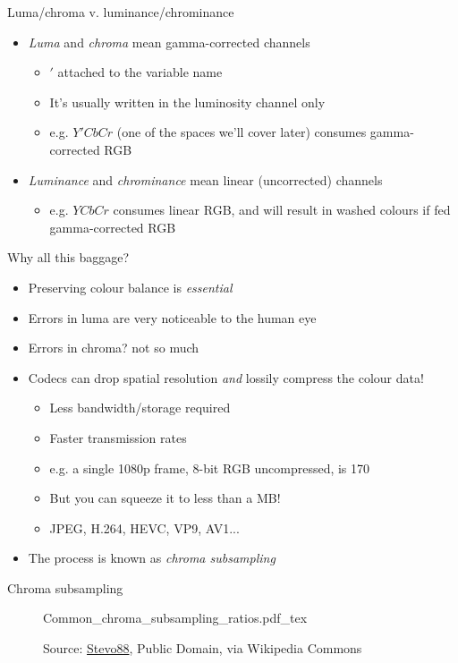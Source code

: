\documentclass[aspectratio=169,handout,usepdftitle=false]{fireshonks}
\begin{document}
\begin{frame}{Luma/chroma v. luminance/chrominance}
    \begin{itemize}
        \item \emph{Luma} and \emph{chroma} mean gamma-corrected channels
              \begin{itemize}
                  \item $'$ attached to the variable name
                  \item It's usually written in the luminosity channel only
                  \item e.g. $Y'CbCr$ (one of the spaces we'll cover later) consumes gamma-corrected RGB
              \end{itemize}
        \item \emph{Luminance} and \emph{chrominance} mean linear (uncorrected) channels
              \begin{itemize}
                  \item e.g. $YCbCr$ consumes linear RGB, and will result in washed colours if fed gamma-corrected RGB
              \end{itemize}
    \end{itemize}
\end{frame}
\begin{frame}{Why all this baggage?}
    \begin{itemize}
        \item Preserving colour balance is \emph{essential}
        \item Errors in luma are very noticeable to the human eye
        \item Errors in chroma? not so much
        \item Codecs can drop spatial resolution \emph{and} lossily compress the colour data!
              \begin{itemize}
                  \item Less bandwidth/storage required
                  \item Faster transmission rates
                  \item e.g. a single 1080p frame, 8-bit RGB uncompressed, is \SI{170}{\mega\byte}
                  \item But you can squeeze it to less than a MB!
                  \item JPEG, H.264, HEVC, VP9, AV1... 
              \end{itemize}
        \item The process is known as \emph{chroma subsampling}
    \end{itemize}
\end{frame}
\begin{frame}{Chroma subsampling}
    \begin{figure}
        \centering
        \def\svgwidth{.6\textwidth}
        {Common_chroma_subsampling_ratios.pdf_tex}
        \caption*{Source: \href{https://commons.wikimedia.org/wiki/File:Common_chroma_subsampling_ratios.svg}{Stevo88}, Public Domain, via Wikipedia Commons}
    \end{figure}
\end{frame}
\end{document}
